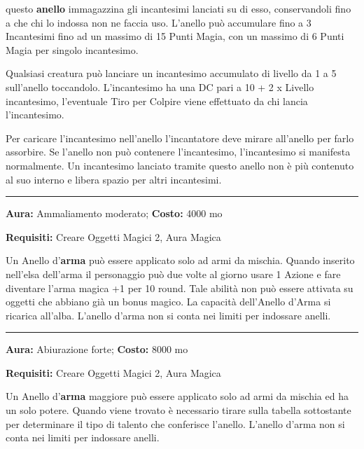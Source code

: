 \begin{multicols}{2}
questo \textbf{anello} immagazzina gli incantesimi lanciati su di esso, conservandoli fino a che chi lo indossa non ne faccia uso. L'anello può accumulare fino a 3 Incantesimi fino ad un massimo di 15 Punti Magia, con un massimo di 6 Punti Magia per singolo incantesimo.

Qualsiasi creatura può lanciare un incantesimo accumulato di livello da 1 a 5 sull'anello toccandolo. L'incantesimo ha una DC pari a 10 + 2 x Livello incantesimo, l'eventuale Tiro per Colpire viene effettuato da chi lancia l'incantesimo.

Per caricare l'incantesimo nell'anello l'incantatore deve mirare all'anello per farlo assorbire. Se l'anello non può contenere l'incantesimo, l'incantesimo si manifesta normalmente. Un incantesimo lanciato tramite questo anello non è più contenuto al suo interno e libera spazio per altri incantesimi.

\smallskip\noindent\rule{\linewidth}{2pt}  \hypertarget{Anellod'Arma}{}\medskip{}\noindent\label{Anellod'Arma}

\textbf{Aura:} Ammaliamento moderato; \textbf{Costo:} 4000 mo

\textbf{Requisiti:} Creare Oggetti Magici 2, Aura Magica

Un Anello d'\textbf{arma} può essere applicato solo ad armi da mischia. Quando inserito nell'elsa dell'arma il personaggio può due volte al giorno usare 1 Azione e fare diventare l'arma magica +1 per 10 round. Tale abilità non può essere attivata su oggetti che abbiano già un bonus magico.
La capacità dell'Anello d'Arma si ricarica all'alba. L'anello d'arma non si conta nei limiti per indossare anelli.

\smallskip\noindent\rule{\linewidth}{2pt}  \hypertarget{Anellod'Armamaggiore}{}\medskip{}\noindent\label{Anellod'Armamaggiore}

\textbf{Aura:} Abiurazione forte; \textbf{Costo:} 8000 mo

\textbf{Requisiti:} Creare Oggetti Magici 2, Aura Magica

Un Anello d'\textbf{arma} maggiore può essere applicato solo ad armi da mischia ed ha un solo potere. Quando viene trovato è necessario tirare sulla tabella sottostante per determinare il tipo di talento che conferisce l'anello. L'anello d'arma non si conta nei limiti per indossare anelli.


\end{multicols}
